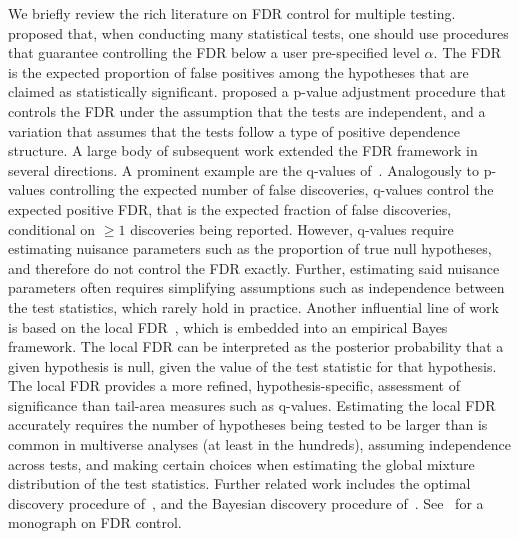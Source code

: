 \documentclass[pdflatex,sn-mathphys-num]{sn-jnl}%
\theoremstyle{thmstyleone}%
\theoremstyle{thmstyletwo}%
\theoremstyle{thmstylethree}%
\begin{document}
We briefly review the rich literature on FDR control for multiple testing.
\cite{benjamini:1995} proposed that, when conducting many statistical tests, one should use procedures that guarantee controlling the FDR below a user pre-specified level $\alpha$. The FDR is the expected proportion of false positives among the hypotheses that are claimed as statistically significant.
\cite{benjamini:1995} proposed a p-value adjustment procedure that controls the FDR under the assumption that the tests are independent, and \cite{benjamini:2001} a variation that assumes that the tests follow a type of positive dependence structure.
A large body of subsequent work extended the FDR framework in several directions.
A prominent example are the q-values of~\cite{storey:2003}.
Analogously to p-values controlling the expected number of false discoveries, q-values control the expected positive FDR, that is the expected fraction of false discoveries, conditional on $\geq 1$ discoveries being reported.
However, q-values require estimating nuisance parameters such as the proportion of true null hypotheses, and therefore do not control the FDR exactly. Further, estimating said nuisance parameters often requires simplifying assumptions such as independence between the test statistics, which rarely hold in practice.
Another influential line of work is based on the local FDR~\citep{efron:2001}, which is embedded into an empirical Bayes framework. The local FDR can be interpreted as the posterior probability that a given hypothesis is null, given the value of the test statistic for that hypothesis. The local FDR provides a more refined, hypothesis-specific, assessment of significance than tail-area measures such as q-values. 
Estimating the local FDR accurately requires the number of hypotheses being tested to be larger than is common in multiverse analyses (at least in the hundreds), assuming independence across tests, and making certain choices when estimating the global mixture distribution of the test statistics.
Further related work includes the optimal discovery procedure of~\cite{storey:2007}, and the Bayesian discovery procedure of~\cite{guindani:2009}. See~\cite{efron:2012} for a monograph on FDR control.
\end{document}
